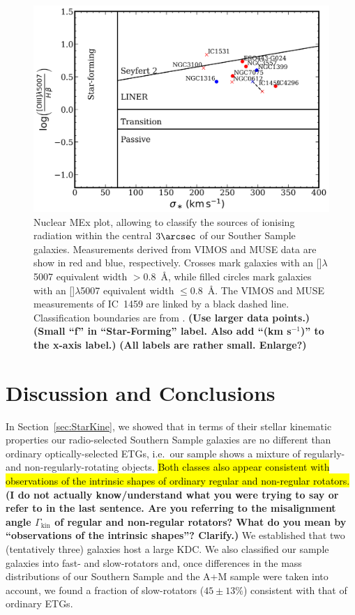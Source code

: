 \documentclass[a4paper,fleqn,usenatbib]{mnras}
\DeclareRobustCommand{\removed}[1]{{\sethlcolor{red}\hl{#1}}}
\begin{document}
\begin{figure}
  \includegraphics[width=\columnwidth]{nuclear_MEx.png}
  \caption{Nuclear MEx plot, allowing to classify the sources of
    ionising radiation within the central $3\arcsec$ of our Souther
    Sample galaxies. Measurements derived from VIMOS and MUSE data are
    show in red and blue, respectively. Crosses mark galaxies with an
    []$\lambda$5007 equivalent width $>0.8$~\AA, while
    filled circles mark galaxies with an []$\lambda$5007
    equivalent width $\leqslant 0.8$~\AA. The VIMOS and MUSE
    measurements of IC~1459 are linked by a black dashed
    line. Classification boundaries are from \citet{Nyland2016}. {\bf
      (Use larger data points.)} {\bf (Small ``f'' in ``Star-Forming''
      label. Also add ``(km s$^{-1}$)'' to the x-axis label.)} {\bf
      (All labels are rather small. Enlarge?)}}
  \label{fig:MEx}
\end{figure}

\section{Discussion and Conclusions}
\label{sec:discuss}

In Section~\ref{sec:StarKine}, we showed that in terms of their
stellar kinematic properties our radio-selected Southern Sample
galaxies are no different than ordinary optically-selected ETGs, i.e.\
our sample shows a mixture of regularly- and non-regularly-rotating
objects. \removed{Both classes also appear consistent with observations of the
intrinsic shapes of ordinary regular and non-regular rotators.} {\bf (I
  do not actually know/understand what you were trying to say or refer
  to in the last sentence. Are you referring to the misalignment angle
  $\Gamma_\text{kin}$ of regular and non-regular rotators? What do you
  mean by ``observations of the intrinsic shapes''? Clarify.)} We
established that two (tentatively three) galaxies host a large KDC. We
also classified our sample galaxies into fast- and slow-rotators and,
once differences in the mass distributions of our Southern Sample and
the A+M sample were taken into account, we found a fraction of
slow-rotators ($45\pm13\%$) consistent with that of ordinary ETGs.
\end{document}
